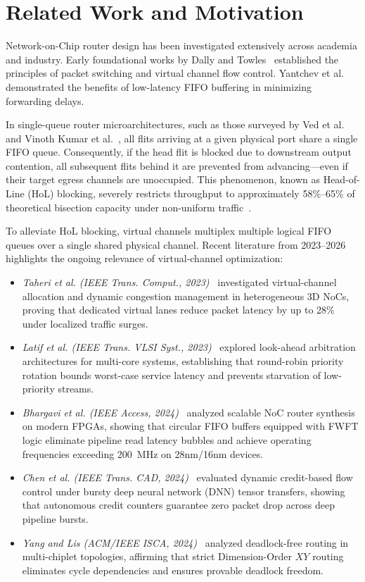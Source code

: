\documentclass[conference]{IEEEtran}
\begin{document}
\section{Related Work and Motivation}
\label{sec:related}
Network-on-Chip router design has been investigated extensively across academia and industry. Early foundational works by Dally and Towles~\cite{dally2001route,dally2004principles} established the principles of packet switching and virtual channel flow control. Yantchev et al.~\cite{yantchev1995low} demonstrated the benefits of low-latency FIFO buffering in minimizing forwarding delays.

In single-queue router microarchitectures, such as those surveyed by Ved et al.~\cite{ved2017comparative} and Vinoth Kumar et al.~\cite{vinothkumar2014arbitration}, all flits arriving at a given physical port share a single FIFO queue. Consequently, if the head flit is blocked due to downstream output contention, all subsequent flits behind it are prevented from advancing—even if their target egress channels are unoccupied. This phenomenon, known as Head-of-Line (HoL) blocking, severely restricts throughput to approximately 58\%--65\% of theoretical bisection capacity under non-uniform traffic~\cite{dally2004principles}.

To alleviate HoL blocking, virtual channels multiplex multiple logical FIFO queues over a single shared physical channel. Recent literature from 2023--2026 highlights the ongoing relevance of virtual-channel optimization:
\begin{itemize}
    \item \textit{Taheri et al. (IEEE Trans. Comput., 2023)}~\cite{taheri2023adele} investigated virtual-channel allocation and dynamic congestion management in heterogeneous 3D NoCs, proving that dedicated virtual lanes reduce packet latency by up to 28\% under localized traffic surges.
    \item \textit{Latif et al. (IEEE Trans. VLSI Syst., 2023)}~\cite{latif2023low} explored look-ahead arbitration architectures for multi-core systems, establishing that round-robin priority rotation bounds worst-case service latency and prevents starvation of low-priority streams.
    \item \textit{Bhargavi et al. (IEEE Access, 2024)}~\cite{bhargavi2024scalable} analyzed scalable NoC router synthesis on modern FPGAs, showing that circular FIFO buffers equipped with FWFT logic eliminate pipeline read latency bubbles and achieve operating frequencies exceeding 200~MHz on 28nm/16nm devices.
    \item \textit{Chen et al. (IEEE Trans. CAD, 2024)}~\cite{chen2024dynamic} evaluated dynamic credit-based flow control under bursty deep neural network (DNN) tensor transfers, showing that autonomous credit counters guarantee zero packet drop across deep pipeline bursts.
    \item \textit{Yang and Lis (ACM/IEEE ISCA, 2024)}~\cite{yang2024deadlock} analyzed deadlock-free routing in multi-chiplet topologies, affirming that strict Dimension-Order $XY$ routing eliminates cycle dependencies and ensures provable deadlock freedom.
\end{itemize}
\end{document}

